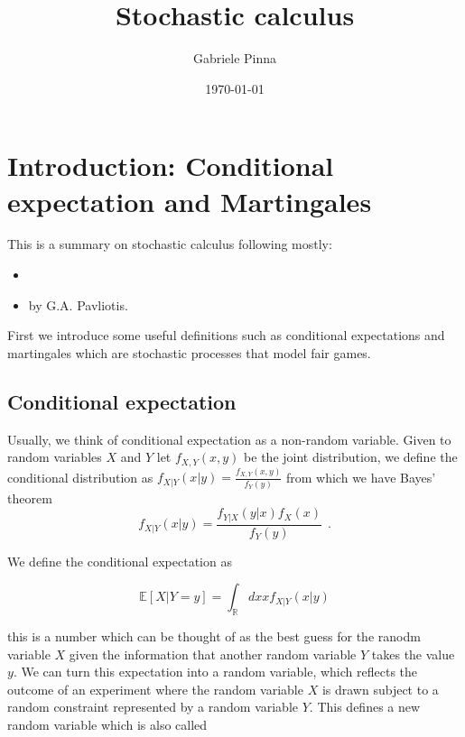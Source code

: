 \documentclass[11pt,a4paper]{article}
\begin{document}
\title{Stochastic calculus}
\author{Gabriele Pinna}
\date{\today}

\maketitle

\tableofcontents
\newpage

\section{Introduction: Conditional expectation and Martingales}
This is a summary on stochastic calculus following mostly:
\begin{itemize}
    \item {}
    \item {} by G.A. Pavliotis.
\end{itemize}
First we introduce some useful definitions such as conditional expectations and martingales which are stochastic processes that model fair games.

\subsection{Conditional expectation}
Usually, we think of conditional expectation as a non-random variable. Given to random variables $X$ and $Y$ let $f_{X,Y}(x,y)$ be the joint distribution, we define the conditional distribution as $f_{X|Y}(x|y) = \frac{f_{X,Y}(x,y)}{f_{Y}(y)}$ from which we have Bayes' theorem
\begin{equation}
f_{X|Y}(x|y)   = \frac{f_{Y|X}(y|x)f_{X}(x)}{f_{Y}(y)} \hspace{5pt}.
\end{equation}

We define the conditional expectation as

\begin{equation}
    \mathbb{E}[X|Y=y] = \int_{\mathbb{R}} dx x f_{X|Y}(x|y)
\end{equation}

this is a number which can be thought of as the best guess for the ranodm variable $X$ given the information that another random variable $Y$ takes the value $y$. We can turn this expectation into a random variable, which reflects the outcome of an experiment where the random variable $X$ is drawn subject to a random constraint represented by a random variable $Y$. This defines a new random variable which is also called 
\end{document}
